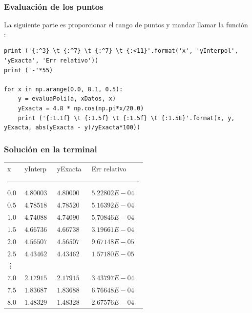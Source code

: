 \begin{frame}
\frametitle{Evaluación de los puntos}
La siguiente parte es proporcionar el rango de puntos y mandar llamar la función :
\\
\medskip
\begin{lstlisting}[caption= Evaluando los puntos, style= FormattedNumber, basicstyle=\linespread{1.1}\ttfamily=\small, columns=fullflexible]
print ('{:^3} \t {:^7} \t {:^7} \t {:<11}'.format('x', 'yInterpol', 'yExacta', 'Err relativo'))
print ('-'*55)

for x in np.arange(0.0, 8.1, 0.5):
    y = evaluaPoli(a, xDatos, x)
    yExacta = 4.8 * np.cos(np.pi*x/20.0)
    print ('{:1.1f} \t {:1.5f} \t {:1.5f} \t {:1.5E}'.format(x, y, yExacta, abs(yExacta - y)/yExacta*100))
\end{lstlisting}
\end{frame}
\begin{frame}
\frametitle{Solución en la terminal}
\fontsize{12}{12}\selectfont
\renewcommand{\arraystretch}{1.1}%
\begin{center}
\begin{tabular}{l l l l}
x & yInterp & yExacta & Err relativo\\
\multicolumn{4}{l}{----------------------------------------------------------} \\
$0.0$ & $4.80003$ & $4.80000$ & $5.22802E-04$ \\
$0.5$ & $4.78518$ & $4.78520$ & $5.16392E-04$ \\
$1.0$ & $4.74088$ & $4.74090$ & $5.70846E-04$ \\
$1.5$ & $4.66736$ & $4.66738$ & $3.19661E-04$ \\
$2.0$ & $4.56507$ & $4.56507$ & $9.67148E-05$ \\
$2.5$ & $4.43462$ & $4.43462$ & $1.57180E-05$ \\
\vdots \\
$7.0$ & $2.17915$ & $2.17915$ & $3.43797E-04$ \\
$7.5$ & $1.83687$ & $1.83688$ & $6.76648E-04$ \\
$8.0$ & $1.48329$ & $1.48328$ & $2.67576E-04$
\end{tabular}
\end{center}
\end{frame}
